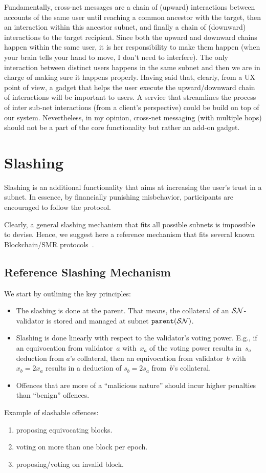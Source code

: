 Fundamentally, cross-net messages are a chain of (upward) interactions between accounts of the same user until reaching a common ancestor with the target, then an interaction within this ancestor subnet, and finally a chain of (downward) interactions to the target recipient. Since both the upward and downward chains happen within the same user, it is her responsibility to make them happen (when your brain tells your hand to move, I don't need to interfere). The only interaction between distinct users happens in the same subnet and then we are in charge of making sure it happens properly.
Having said that, clearly, from a UX point of view, a gadget that helps the user execute the upward/downward chain of interactions will be important to users.
A service that streamlines the process of inter sub-net interactions (from a client's perspective) could be build on top of our system.
Nevertheless, in my opinion, cross-net messaging (with multiple hops) should not be a part of the core functionality but rather an add-on gadget. 



\section{Slashing}\label{sec:slashing}
Slashing is an additional functionality that aims at increasing the user's trust in a subnet.
In essence, by financially punishing misbehavior, participants are encouraged to follow the protocol.

Clearly, a general slashing mechanism that fits all possible subnets is impossible to devise. Hence, we suggest here a reference mechanism that fits several known Blockchain/SMR protocols~\cite{Filecoin,ETH,...}.

\subsection{Reference Slashing Mechanism}
We start by outlining the key principles:
\begin{itemize}
    \item The slashing is done at the parent. That means, the collateral of an $\mathcal{SN}$-validator is stored and managed at subnet $\texttt{parent}(\mathcal{SN})$.
    \item Slashing is done linearly with respect to the validator's voting power. E.g., if an equivocation from validator~$a$ with~$x_a$ of the voting power results in~$s_a$ deduction from $a$'s collateral, then an equivocation from validator~$b$ with $x_b=2x_a$ results in a deduction of $s_b=2s_a$ from~$b$'s collateral.
    \item Offences that are more of a ``malicious nature'' should incur higher penalties than ``benign'' offences.
\end{itemize}
Example of slashable offences:
\begin{enumerate}
    \item proposing equivocating blocks.
    \item voting on more than one block per epoch.
    \item proposing/voting on invalid block.
\end{enumerate}